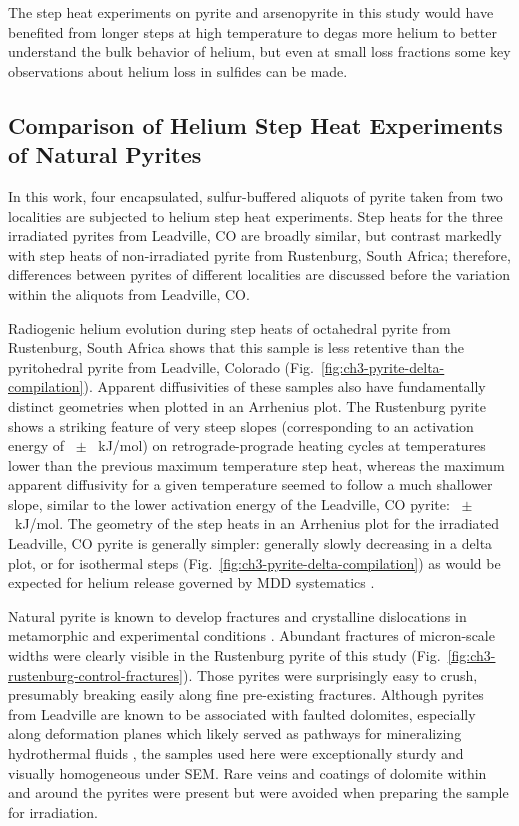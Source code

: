 The step heat experiments on pyrite and arsenopyrite in this study would
have benefited from longer steps at high temperature to degas more
helium to better understand the bulk behavior of helium, but even at
small loss fractions some key observations about helium loss in sulfides
can be made.

\subsection{Comparison of Helium Step Heat Experiments of Natural Pyrites}\label{ch3-compare-pyrites-discussion}

In this work, four encapsulated, sulfur-buffered aliquots of pyrite
taken from two localities are subjected to helium step heat experiments.
Step heats for the three irradiated pyrites from Leadville, CO are
broadly similar, but contrast markedly with step heats of non-irradiated
pyrite from Rustenburg, South Africa; therefore, differences between
pyrites of different localities are discussed before the variation within
the aliquots from Leadville, CO.

Radiogenic helium evolution during step heats of octahedral pyrite from
Rustenburg, South Africa shows that this sample is less retentive than
the pyritohedral pyrite from Leadville, Colorado (Fig.~\ref{fig:ch3-pyrite-delta-compilation}).
Apparent diffusivities of these samples also have fundamentally distinct
geometries when plotted in an Arrhenius plot. The Rustenburg pyrite
shows a striking feature of very steep slopes (corresponding to an
activation energy of \ChThreeRustEa\ $\pm$ \ChThreeRustEaErr\ kJ/mol) on
retrograde-prograde heating cycles at temperatures lower than the
previous maximum temperature step heat, whereas the maximum apparent
diffusivity for a given temperature seemed to follow a much shallower
slope, similar to the lower activation energy of the Leadville, CO pyrite: \ChThreeLVCOEa\ $\pm$ \ChThreeLVCOEaErr\
kJ/mol. The geometry of the step heats in an Arrhenius
plot for the irradiated Leadville, CO pyrite is generally simpler:
generally slowly decreasing in a delta plot, or for isothermal steps
(Fig.~\ref{fig:ch3-pyrite-delta-compilation}) as would be expected for helium release governed by
MDD systematics \citep{farley2018}.

Natural pyrite is known to develop fractures and crystalline
dislocations in metamorphic and experimental conditions \citep{gill1969,
mcclayellis1983,barrie2011}. Abundant fractures of
micron-scale widths were clearly visible in the Rustenburg pyrite of
this study (Fig.~\ref{fig:ch3-rustenburg-control-fractures}). Those pyrites were surprisingly easy to crush,
presumably breaking easily along fine pre-existing fractures. Although
pyrites from Leadville are known to be associated with faulted
dolomites, especially along deformation planes which likely served as
pathways for mineralizing hydrothermal fluids \citep{nash1979}, the samples
used here were exceptionally sturdy and visually homogeneous under SEM.
Rare veins and coatings of dolomite within and around the pyrites were
present but were avoided when preparing the sample for irradiation.


